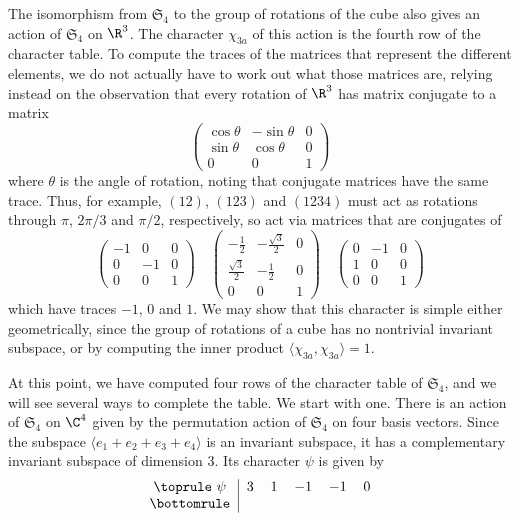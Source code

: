 \begin{example}
The isomorphism from $\mathfrak{S}_4$ to the group of rotations of the cube also gives an action of $\mathfrak{S}_4$ on $\R^3$. The character $\chi_{3a}$ of this action is the fourth row of the character table. To compute the traces of the matrices that represent the different elements, we do not actually have to work out what those matrices are, relying instead on the observation that every rotation of $\R^3$ has matrix conjugate to a matrix
\[\begin{pmatrix}
\cos\theta&-\sin\theta&0\\
\sin\theta&\cos\theta&0\\
0&0&1
\end{pmatrix}\]
where $\theta$ is the angle of rotation, noting that conjugate matrices have the same trace. Thus, for example, $(12)$, $(123)$ and $(1234)$ must act as rotations through $\pi$, $2\pi/3$ and $\pi/2$, respectively, so act via matrices that are conjugates of
\[\begin{pmatrix}
-1&0&0\\[6pt]
0&-1&0\\[6pt]
0&0&1
\end{pmatrix}\quad\begin{pmatrix}
-\frac{1}{2}&-\frac{\sqrt{3}}{2}&0\\[6pt]
\frac{\sqrt{3}}{2}&-\frac{1}{2}&0\\[6pt]
0&0&1
\end{pmatrix}\quad \begin{pmatrix}
0&-1&0\\[6pt]
1&0&0\\[6pt]
0&0&1
\end{pmatrix}\]
which have traces $-1$, $0$ and $1$. We may show that this character is simple either geometrically, since the group of rotations of a cube has no nontrivial invariant subspace, or by computing the inner product $\langle\chi_{3a},\chi_{3a}\rangle=1$.\par
At this point, we have computed four rows of the character table of $\mathfrak{S}_4$, and we will see several ways to complete the table. We start with one. There is an action of $\mathfrak{S}_4$ on $\C^4$ given by the permutation action of $\mathfrak{S}_4$ on four basis vectors. Since the subspace $\langle e_1+e_2+e_3+e_4\rangle$ is an invariant subspace, it has a complementary invariant subspace of dimension $3$. Its character $\psi$ is given by
\[
\begin{tabular}{c|ccccc}
\toprule
$\psi$&$3$&$1$&$-1$&$-1$&$0$\\
\bottomrule

\end{tabular}\]
\end{example}

